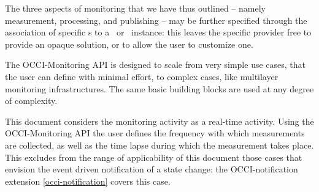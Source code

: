 \documentclass[10pt,a4paper]{article}
\begin{document}
The three aspects of monitoring that we have thus outlined -- namely measurement, processing, and publishing -- may be further specified through the association of specific \mi s to a \sens\ or \coll\ instance: this leaves the specific provider free to provide an opaque solution, or to allow the user to customize one.



The OCCI-Monitoring API is designed to scale from very simple use cases, that the user can define with minimal effort, to complex cases, like multilayer monitoring infrastructures. The same basic building blocks are used at any degree of complexity.



This document considers the monitoring activity as a real-time activity. Using the OCCI-Monitoring API the user defines the frequency with which measurements are collected, as well as the time lapse during which the measurement takes place. This excludes from the range of applicability of this document those cases that envision the event driven notification of a state change: the OCCI-notification extension \ref{occi-notification} covers this case.
\end{document}
